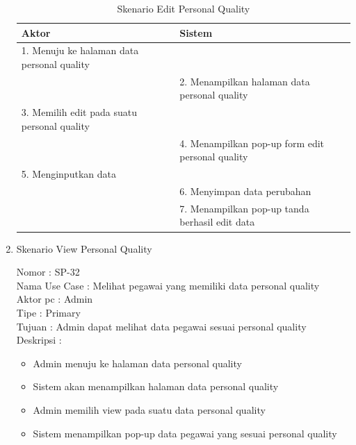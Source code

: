 \begin{enumerate}
\begin{itemize}
\end{itemize}

\begin{table}
	\caption{Skenario Edit Personal Quality}
	\centering
	\begin{tabular}{ | l | p{54.5mm} |}
		\hline 
		\textbf{Aktor} & \textbf{Sistem} \\
		\hline
		
		1.	Menuju ke halaman data personal quality &  \\
		
		\hline
		
		&  2.	Menampilkan halaman data personal quality \\
		
		\hline
		
		3. Memilih edit pada suatu personal quality & \\
		
		\hline
		
		& 4.	Menampilkan pop-up form edit personal quality \\
		
		\hline
		
		5.	Menginputkan data  & \\
		\hline
		
		& 6.	Menyimpan data perubahan \\
		\hline
		
		& 7.	Menampilkan pop-up tanda berhasil edit data \\
		\hline
		
	\end{tabular}
\end{table}

\item Skenario View Personal Quality

Nomor \kern 3.6pc : SP-32 \\
Nama Use Case : Melihat pegawai yang memiliki data personal quality \\
Aktor  pc : Admin \\
Tipe \kern 4.6pc : Primary \\
Tujuan \kern 3.6pc : Admin dapat melihat data pegawai sesuai personal quality \\
Deskripsi \kern 2.5pc : 

\begin{itemize}
	\item Admin menuju ke halaman data personal quality
	\item Sistem akan menampilkan halaman data personal quality
	\item Admin memilih view pada suatu data personal quality
	\item Sistem menampilkan pop-up data pegawai yang sesuai personal quality
	

\end{itemize}
\end{enumerate}
